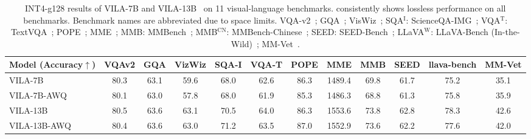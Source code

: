 \begin{table}
    \setlength{\tabcolsep}{5pt}
    \small
    \centering
\begin{tabular}{@{}lccccccccccc@{}}
\toprule
\textbf{Model (Accuracy$\uparrow$)} & VQAv2 & GQA & VizWiz & SQA-I & VQA-T & POPE & MME & MMB & SEED & llava-bench & MM-Vet \\
\midrule
VILA-7B           & 80.3 & 63.1 & 59.6   & 68.0  & 62.6  & 86.3  & 1489.4 & 69.8	   & 61.7 & 75.2        & 35.1   \\
VILA-7B-AWQ       & 80.1 & 63.0 & 57.8   & 68.0  & 61.9  & 85.3  & 1486.3 & 68.8   & 61.3 & 75.8        & 35.9   \\
VILA-13B          & 80.5 & 63.6 & 63.1   & 70.5  & 64.0  & 86.3  & 1553.6 & 73.8   & 62.8 & 78.3        & 42.6   \\
VILA-13B-AWQ      & 80.4 & 63.6 & 63.0   & 71.2  & 63.5  & 87.0  & 1552.9 & 73.6   & 62.2 & 77.6        & 42.0   \\
\bottomrule
\end{tabular}
\caption{INT4-g128 results of VILA-7B and VILA-13B~\cite{lin2023vila} on 11 visual-language benchmarks. \methodshort consistently shows lossless performance on all benchmarks. Benchmark names are abbreviated due to space limits. VQA-v2~\cite{goyal2017vqav2}; GQA~\cite{hudson2019gqa}; VisWiz~\cite{gurari2018vizwiz}; SQA$^\text{I}$: ScienceQA-IMG~\cite{lu2022learn}; VQA$^\text{T}$: TextVQA~\cite{singh2019textvqa}; POPE~\cite{li2023pope}; MME~\cite{fu2023mme}; MMB: MMBench~\cite{liu2023mmbench}; MMB$^\text{CN}$: MMBench-Chinese~\cite{liu2023mmbench}; SEED: SEED-Bench~\cite{li2023seed}; LLaVA$^\text{W}$: LLaVA-Bench (In-the-Wild)~\cite{liu2023llava}; MM-Vet~\cite{yu2023mmvet}.}
\label{tab:vila_acc}

\end{table}
